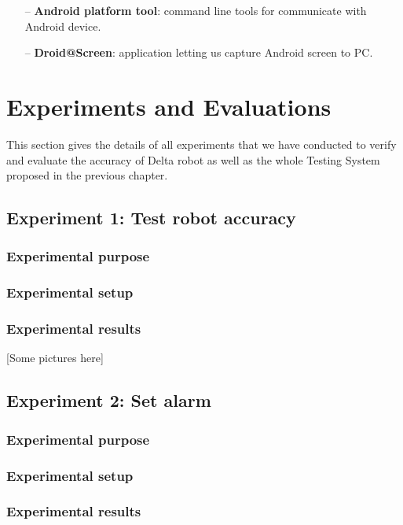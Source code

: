 	\begin{itemize}
		\item[--] \textbf{Android platform tool}: command line tools for communicate with Android device.
		\item[--] \textbf{Droid@Screen}: application letting us capture Android screen to PC.
	\end{itemize}

\section{Experiments and Evaluations}
This section gives the details of all experiments that we have conducted to verify and evaluate the accuracy of Delta robot as well as the whole Testing System proposed in the previous chapter.

\subsection{Experiment 1: Test robot accuracy}
\subsubsection{Experimental purpose}

\subsubsection{Experimental setup}

\subsubsection{Experimental results}
[Some pictures here]

\subsection{Experiment 2: Set alarm}
\subsubsection{Experimental purpose}

\subsubsection{Experimental setup}

\subsubsection{Experimental results}

